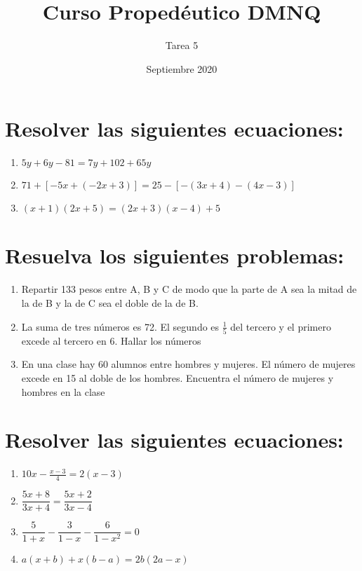 \documentclass{article}
\title{Curso Propedéutico DMNQ}
\author{Tarea 5}
\date{Septiembre 2020}
\begin{document}
\maketitle      

\section*{Resolver las siguientes ecuaciones:}

\begin{enumerate}
    \item $5y + 6y - 81 = 7y + 102 + 65y$
    \item $71 + [-5x + (-2x + 3)] = 25 - [-(3x + 4) - (4x - 3)]$
    \item $(x + 1)(2x + 5) = (2x + 3)(x - 4) + 5$
\end{enumerate}


\section*{Resuelva los siguientes problemas:}


\begin{enumerate}
    \item Repartir 133 pesos entre A, B y C de modo que la parte de A sea la mitad de la de B
y la de C sea el doble de la de B.
    \item La suma de tres números es 72. El segundo es $\frac{1}{5}$ del tercero y el primero excede al tercero en 6. Hallar los números
    \item En una clase hay 60 alumnos entre hombres y mujeres. El número de mujeres excede en 15 al doble de los hombres. Encuentra el número de mujeres y hombres en la clase
\end{enumerate}


\section*{Resolver las siguientes ecuaciones:}

\begin{enumerate}
    \item $10x - \frac{x-3}{4} = 2(x - 3)$
    \item $\dfrac{5x+8}{3x+4}=\dfrac{5x+2}{3x-4}$
    \item $\dfrac{5}{1+x} -\dfrac{3}{1-x} -\dfrac{6}{1-x^2} = 0$
    \item $a(x + b) + x(b - a)=2b(2a - x)$
\end{enumerate}
\end{document}
